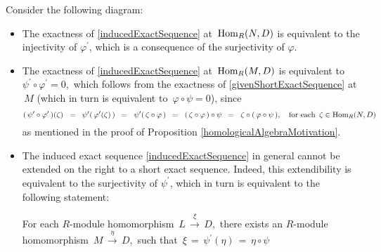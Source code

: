 
\vskip 0.5cm
\begin{remark}
\mbox{}
\vskip 0.1cm
\noindent
Consider the following diagram:
\begin{center}
\end{center}
\begin{itemize}
\item
	The exactness of \eqref{inducedExactSequence} at \,$\textnormal{Hom}_{R}(N,D)$
	is equivalent to the injectivity of $\varphi^{\prime}$,
	which is a consequence of the surjectivity of $\varphi$.
\item
	The exactness of \eqref{inducedExactSequence} at \,$\textnormal{Hom}_{R}(M,D)$
	is equivalent to \,$\psi^{\prime}\circ\varphi^{\prime} = 0$,\,
	which follows from the exactness of \eqref{givenShortExactSequence} at \,$M$
	(which in turn is equivalent to \,$\varphi \circ \psi = 0$),
	since
	\begin{equation*}
	(\,\psi^{\prime}\circ\varphi^{\prime}\,)(\zeta)
	\;\; = \;\;
		\psi^{\prime}(\,\varphi^{\prime}(\zeta)\,)
	\;\; = \;\;
		\psi^{\prime}(\,\zeta \circ \varphi\,)
	\;\; = \;\;
		(\,\zeta \circ \varphi\,) \circ \psi
	\;\; = \;\;
		\zeta \circ (\,\varphi \circ \psi\,),
	\quad
		\textnormal{for each \,$\zeta \in \textnormal{Hom}_{R}(N,D)$}
	\end{equation*}
	as mentioned in the proof of Proposition \ref{homologicalAlgebraMotivation}.
\item
	The induced exact sequence \eqref{inducedExactSequence}
	in general cannot be extended on the right to a short exact sequence.
	Indeed, this extendibility is equivalent to the surjectivity of $\psi^{\prime}$,
	which in turn is equivalent to the following statement:
	\begin{center}
	\begin{minipage}{6.0in}
	\textnormal{For each $R$-module homomorphism
	\,$L\,\overset{\xi}{\longrightarrow}\,D$,\,
	there exists an $R$-module homomorphism
	\,$M\,\overset{\eta}{\longrightarrow}\,D$,\,
	such that
	\,$\xi \,=\, \psi^{\prime}(\eta) \,=\, \eta \circ \psi$
	}
	\end{minipage}

\end{center}
\end{itemize}
\end{remark}
